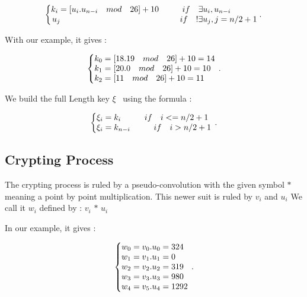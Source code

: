 \documentclass[letterpaper,10pt,english]{sphinxmanual}
\begin{document}
\begin{equation}
\centering
\left\{\begin{array}{@{}l@{}}
k_{i}=[u_{i}.u_{n-i} \quad mod \quad 26 ] + 10  \hspace*{1cm} if \quad \exists u_{i} , u_{n-i}  \\
\left. u_{j}  \; \hspace*{5cm} if \quad !\exists u_{j}, j = n/2 + 1
\right.\end{array}\,.
\right.\end{equation}

With our example, it gives :

\begin{equation}
\centering
\left\{\begin{array}{@{}l@{}}
k_{0}=[18.19 \quad  mod \quad  26] + 10 = 14 \\
k_{1}=[20.0 \quad  mod \quad  26] + 10 = 10 \\
k_{2}=[11 \quad  mod \quad  26] + 10 = 11 \\
\end{array}\right.\,.
\end{equation}

We build the full Length key $\xi$  \ using the formula :

\begin{equation}
\centering
\left\{\begin{array}{@{}l@{}}
\xi_{i} = k_{i} \hspace*{1cm} if \quad i <= n/2 + 1 \\ 
\xi_{i} = k_{n-i} \hspace*{1cm} if \quad i > n/2 + 1 \\ 
\end{array}\right.\,.
\end{equation}

\newpage

\subsection{Crypting Process}
\begin{flushleft}
The crypting process is ruled by a pseudo-convolution with the given symbol $*$ meaning a point by point multiplication. 
This newer suit is ruled by $v_{i}$ and $u_{i}$
We call it $w_{i}$ defined by : $v_{i}$ $*$ $u_{i}$

In our example, it gives :
\end{flushleft}

\begin{equation}
\centering
\left\{\begin{array}{@{}l@{}}
w_{0}=v_{0}.u_{0}=324 \\
w_{1}=v_{1}.u_{1}=0 \\
w_{2}=v_{2}.u_{2}=319 \\
w_{3}=v_{3}.u_{3}=980 \\
w_{4}=v_{5}.u_{4}=1292 \\
\end{array}\right.\,.
\end{equation}
\end{document}
